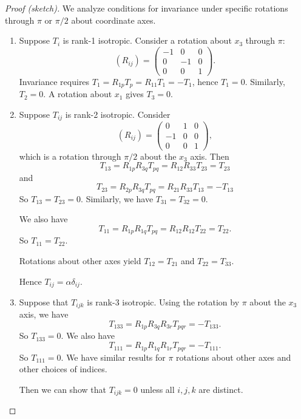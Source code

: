\documentclass[a4paper]{article}
\begin{document}
\begin{proof}[Proof (sketch)]
  We analyze conditions for invariance under specific rotations through $\pi$ or $\pi/2$ about coordinate axes.

  \begin{enumerate}
    \item Suppose $T_i$ is rank-1 isotropic. Consider a rotation about $x_3$ through $\pi$:
      \[
        (R_{ij}) =
        \begin{pmatrix}
          -1 & 0 & 0\\
          0 & -1 & 0\\
          0 & 0 & 1
        \end{pmatrix}.
      \]
      Invariance requires $T_1 = R_{1p}T_p = R_{11} T_1 = -T_1$, hence $T_1 = 0$. Similarly, $T_2 = 0$. A rotation about $x_1$ gives $T_3 = 0$.
    \item Suppose $T_{ij}$ is rank-2 isotropic. Consider
      \[
        (R_{ij}) =
        \begin{pmatrix}
          0 & 1 & 0\\
          -1 & 0 & 0\\
          0 & 0 & 1
        \end{pmatrix},
      \]
      which is a rotation through $\pi/2$ about the $x_3$ axis. Then
      \[
        T_{13} = R_{1p}R_{3q} T_{pq} = R_{12}R_{33}T_{23} = T_{23}
      \]
      and
      \[
        T_{23} = R_{2p}R_{3q} T_{pq} = R_{21}R_{33}T_{13} = -T_{13}
      \]
      So $T_{13} = T_{23} = 0$. Similarly, we have $T_{31} = T_{32} = 0$.

      We also have
      \[
        T_{11} = R_{1p} R_{1q} T_{pq} = R_{12} R_{12}T_{22} = T_{22}.
      \]
      So $T_{11} = T_{22}$.

      Rotations about other axes yield $T_{12} = T_{21}$ and $T_{22} = T_{33}$.

      Hence $T_{ij} = \alpha \delta_{ij}$.

    \item Suppose that $T_{ijk}$ is rank-3 isotropic. Using the rotation by $\pi$ about the $x_3$ axis, we have
      \[
        T_{133} = R_{1p}R_{3q}R_{3r}T_{pqr} = -T_{133}.
      \]
      So $T_{133} = 0$. We also have
      \[
        T_{111} = R_{1p}R_{1q}R_{1r}T_{pqr} = -T_{111}.
      \]
      So $T_{111} = 0$. We have similar results for $\pi$ rotations about other axes and other choices of indices.

      Then we can show that $T_{ijk} = 0$ unless all $i, j, k$ are distinct.


\end{enumerate}
\end{proof}
\end{document}
